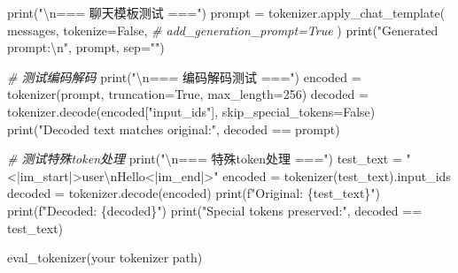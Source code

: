 \documentclass[
]{article}
\newenvironment{Shaded}{}{}
\newcommand{\BuiltInTok}[1]{\textcolor[rgb]{0.00,0.50,0.00}{#1}}
\newcommand{\CharTok}[1]{\textcolor[rgb]{0.25,0.44,0.63}{#1}}
\newcommand{\CommentTok}[1]{\textcolor[rgb]{0.38,0.63,0.69}{\textit{#1}}}
\newcommand{\DecValTok}[1]{\textcolor[rgb]{0.25,0.63,0.44}{#1}}
\newcommand{\NormalTok}[1]{#1}
\newcommand{\OperatorTok}[1]{\textcolor[rgb]{0.40,0.40,0.40}{#1}}
\newcommand{\SpecialCharTok}[1]{\textcolor[rgb]{0.25,0.44,0.63}{#1}}
\newcommand{\SpecialStringTok}[1]{\textcolor[rgb]{0.73,0.40,0.53}{#1}}
\newcommand{\StringTok}[1]{\textcolor[rgb]{0.25,0.44,0.63}{#1}}
\newcommand{\VariableTok}[1]{\textcolor[rgb]{0.10,0.09,0.49}{#1}}
\begin{document}
\begin{Shaded}
\begin{Highlighting}[]
    \BuiltInTok{print}\NormalTok{(}\StringTok{"}\CharTok{\textbackslash{}n}\StringTok{=== 聊天模板测试 ==="}\NormalTok{)}
\NormalTok{    prompt }\OperatorTok{=}\NormalTok{ tokenizer.apply\_chat\_template(}
\NormalTok{        messages, }
\NormalTok{        tokenize}\OperatorTok{=}\VariableTok{False}\NormalTok{, }
        \CommentTok{\# add\_generation\_prompt=True}
\NormalTok{    )}
    \BuiltInTok{print}\NormalTok{(}\StringTok{"Generated prompt:}\CharTok{\textbackslash{}n}\StringTok{"}\NormalTok{, prompt, sep}\OperatorTok{=}\StringTok{""}\NormalTok{)}

    \CommentTok{\# 测试编码解码}
    \BuiltInTok{print}\NormalTok{(}\StringTok{"}\CharTok{\textbackslash{}n}\StringTok{=== 编码解码测试 ==="}\NormalTok{)}
\NormalTok{    encoded }\OperatorTok{=}\NormalTok{ tokenizer(prompt, truncation}\OperatorTok{=}\VariableTok{True}\NormalTok{, max\_length}\OperatorTok{=}\DecValTok{256}\NormalTok{)}
\NormalTok{    decoded }\OperatorTok{=}\NormalTok{ tokenizer.decode(encoded[}\StringTok{"input\_ids"}\NormalTok{], skip\_special\_tokens}\OperatorTok{=}\VariableTok{False}\NormalTok{)}
    \BuiltInTok{print}\NormalTok{(}\StringTok{"Decoded text matches original:"}\NormalTok{, decoded }\OperatorTok{==}\NormalTok{ prompt)}

    \CommentTok{\# 测试特殊token处理}
    \BuiltInTok{print}\NormalTok{(}\StringTok{"}\CharTok{\textbackslash{}n}\StringTok{=== 特殊token处理 ==="}\NormalTok{)}
\NormalTok{    test\_text }\OperatorTok{=} \StringTok{"\textless{}|im\_start|\textgreater{}user}\CharTok{\textbackslash{}n}\StringTok{Hello\textless{}|im\_end|\textgreater{}"}
\NormalTok{    encoded }\OperatorTok{=}\NormalTok{ tokenizer(test\_text).input\_ids}
\NormalTok{    decoded }\OperatorTok{=}\NormalTok{ tokenizer.decode(encoded)}
    \BuiltInTok{print}\NormalTok{(}\SpecialStringTok{f"Original: }\SpecialCharTok{\{}\NormalTok{test\_text}\SpecialCharTok{\}}\SpecialStringTok{"}\NormalTok{)}
    \BuiltInTok{print}\NormalTok{(}\SpecialStringTok{f"Decoded:  }\SpecialCharTok{\{}\NormalTok{decoded}\SpecialCharTok{\}}\SpecialStringTok{"}\NormalTok{)}
    \BuiltInTok{print}\NormalTok{(}\StringTok{"Special tokens preserved:"}\NormalTok{, decoded }\OperatorTok{==}\NormalTok{ test\_text)}
\end{Highlighting}
\end{Shaded}

\begin{Shaded}
\begin{Highlighting}[]
\NormalTok{eval\_tokenizer(}\StringTok{\textquotesingle{}your tokenizer path\textquotesingle{}}\NormalTok{)}
\end{Highlighting}
\end{Shaded}
\end{document}
